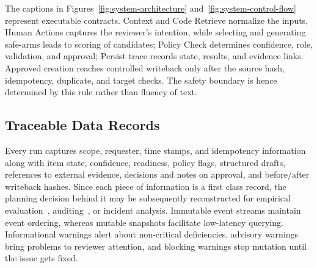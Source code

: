 \documentclass[manuscript,review]{acmart}
\begin{document}
The captions in Figures~\ref{fig:system-architecture} and~\ref{fig:system-control-flow} represent executable contracts. Context and Code Retrieve normalize the inputs, Human Actions captures the reviewer’s intention, while selecting and generating safe-arms leads to scoring of candidates; Policy Check determines confidence, role, validation, and approval; Persist trace records state, results, and evidence links. Approved creation reaches controlled writeback only after the source hash, idempotency, duplicate, and target checks. The safety boundary is hence determined by this rule rather than fluency of text.

\subsection{Traceable Data Records}
Every run captures scope, requester, time stamps, and idempotency information along with item state, confidence, readiness, policy flags, structured drafts, references to external evidence, decisions and notes on approval, and before/after writeback hashes. Since each piece of information is a first class record, the planning decision behind it may be subsequently reconstructed for empirical evaluation~\cite{R70,R54}, auditing~\cite{R93}, or incident analysis. Immutable event streams maintain event ordering, whereas mutable snapshots facilitate low-latency querying. Informational warnings alert about non-critical deficiencies, advisory warnings bring problems to reviewer attention, and blocking warnings stop mutation until the issue gets fixed.
\end{document}
